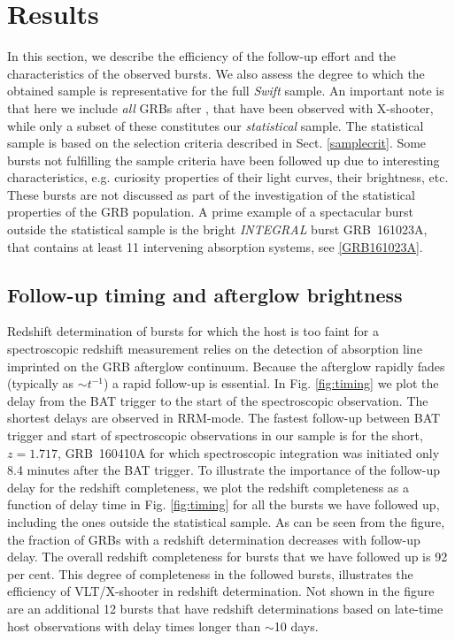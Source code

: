 \documentclass{aa}    %
\begin{document}
\section{Results} \label{results}

In this section, we describe the efficiency of the follow-up effort and the
characteristics of the observed bursts. We also assess the degree to which the
obtained sample is representative for the full \textit{Swift} sample. An
important note is that here we include \textit{all} GRBs after \startdate, that
have been observed with X-shooter, while only a subset of these constitutes our
\textit{statistical} sample. The statistical sample is based on the selection
criteria described in Sect. \ref{samplecrit}. Some bursts not fulfilling the
sample criteria have been followed up due to interesting characteristics, e.g.
curiosity properties of their light curves, their brightness, etc. These bursts
are not discussed as part of the investigation of the statistical properties of
the GRB population. A prime example of a spectacular burst outside the
statistical sample is the bright \textit{INTEGRAL} burst GRB~161023A, that
contains at least 11 intervening absorption systems, see \ref{GRB161023A}.


\subsection{Follow-up timing and afterglow brightness} \label{timing}

Redshift determination of bursts for which the host is too faint for a
spectroscopic redshift measurement relies on the detection of absorption line
imprinted on the GRB afterglow continuum. Because the afterglow rapidly fades
(typically as $\sim t^{-1}$) a rapid follow-up is essential. In Fig.
\ref{fig:timing} we plot the delay from the BAT trigger to the start of the
spectroscopic observation. The shortest delays are observed in RRM-mode. The
fastest follow-up between BAT trigger and start of spectroscopic observations in
our sample is for the short, $z = 1.717$, GRB~160410A for which spectroscopic
integration was initiated only 8.4 minutes after the BAT trigger. To illustrate
the importance of the follow-up delay for the redshift completeness, we plot the
redshift completeness as a function of delay time in Fig. \ref{fig:timing} for
all the bursts we have followed up, including the ones outside the statistical
sample. As can be seen from the figure, the fraction of GRBs with a redshift
determination decreases with follow-up delay. The overall redshift completeness
for bursts that we have followed up is 92 per cent. This degree of completeness
in the followed bursts, illustrates the efficiency of VLT/X-shooter in redshift
determination. Not shown in the figure are an additional 12 bursts that have
redshift determinations based on late-time host observations with delay times
longer than $\sim$10 days.
\end{document}
